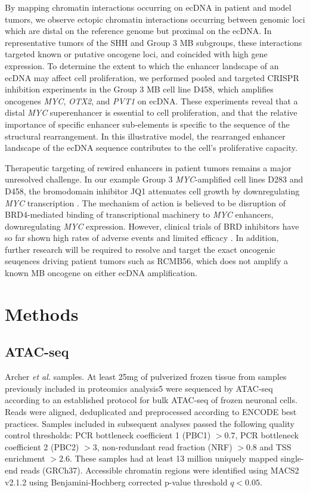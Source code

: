 By mapping chromatin interactions occurring on ecDNA in patient and model tumors, we observe ectopic chromatin interactions occurring between genomic loci which are distal on the reference genome but proximal on the ecDNA. In representative tumors of the SHH and Group 3 \gls{MB} subgroups, these interactions targeted known or putative oncogene loci, and coincided with high gene expression. To determine the extent to which the enhancer landscape of an ecDNA may affect cell proliferation, we performed pooled and targeted CRISPR inhibition experiments in the Group 3 MB cell line D458, which amplifies oncogenes \textit{MYC}, \textit{OTX2}, and \textit{PVT1} on ecDNA. These experiments reveal that a distal \textit{MYC} superenhancer is essential to cell proliferation, and that the relative importance of specific enhancer sub-elements is specific to the sequence of the structural rearrangement. In this illustrative model, the rearranged enhancer landscape of the ecDNA sequence contributes to the cell's proliferative capacity.

Therapeutic targeting of rewired enhancers in patient tumors remains a major unresolved challenge. In our example Group 3 \textit{MYC}-amplified cell lines D283 and D458, the bromodomain inhibitor JQ1 attenuates cell growth by downregulating \textit{MYC} transcription \cite{bandopadhayay_2014}. The mechanism of action is believed to be disruption of BRD4-mediated binding of transcriptional machinery to \textit{MYC} enhancers, downregulating \textit{MYC} expression. However, clinical trials of BRD inhibitors have so far shown high rates of adverse events and limited efficacy \cite{sun_2020}. In addition, further research will be required to resolve and target the exact oncogenic seuqences driving patient tumors such as RCMB56, which does not amplify a known MB oncogene on either ecDNA amplification.

\section{Methods}
\subsection{ATAC-seq}
Archer \textit{et al.} samples. At least 25mg of pulverized frozen tissue from samples previously included in proteomics analysis5 were sequenced by ATAC-seq according to an established protocol for bulk ATAC-seq of frozen neuronal cells\cite{milani_2016}. Reads were aligned, deduplicated and preprocessed according to ENCODE best practices. Samples included in subsequent analyses passed the following quality control thresholds: PCR bottleneck coefficient 1 (PBC1) $> 0.7$, PCR bottleneck coefficient 2 (PBC2) $> 3$, non-redundant read fraction (NRF) $> 0.8$ and TSS enrichment $> 2.6$. These samples had at least 13 million uniquely mapped single-end reads (GRCh37). Accessible chromatin regions were identified using MACS2 v2.1.2 \cite{macs} using Benjamini-Hochberg corrected p-value threshold $q< 0.05$.

